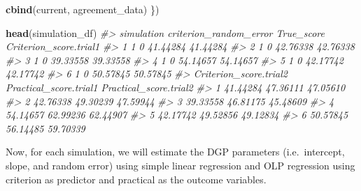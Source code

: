 \documentclass[
]{book}
\newenvironment{Shaded}{\begin{snugshade}}{\end{snugshade}}
\newcommand{\CommentTok}[1]{\textcolor[rgb]{0.56,0.35,0.01}{\textit{#1}}}
\newcommand{\KeywordTok}[1]{\textcolor[rgb]{0.13,0.29,0.53}{\textbf{#1}}}
\newcommand{\NormalTok}[1]{#1}
\begin{document}
\begin{Shaded}
\begin{Highlighting}[]
    \KeywordTok{cbind}\NormalTok{(current, agreement\_data)}
\NormalTok{  \})}

\KeywordTok{head}\NormalTok{(simulation\_df)}
\CommentTok{\#>   simulation criterion\_random\_error True\_score Criterion\_score.trial1}
\CommentTok{\#> 1          1                      0   41.44284               41.44284}
\CommentTok{\#> 2          1                      0   42.76338               42.76338}
\CommentTok{\#> 3          1                      0   39.33558               39.33558}
\CommentTok{\#> 4          1                      0   54.14657               54.14657}
\CommentTok{\#> 5          1                      0   42.17742               42.17742}
\CommentTok{\#> 6          1                      0   50.57845               50.57845}
\CommentTok{\#>   Criterion\_score.trial2 Practical\_score.trial1 Practical\_score.trial2}
\CommentTok{\#> 1               41.44284               47.36111               47.05610}
\CommentTok{\#> 2               42.76338               49.30239               47.59944}
\CommentTok{\#> 3               39.33558               46.81175               45.48609}
\CommentTok{\#> 4               54.14657               62.99236               62.44907}
\CommentTok{\#> 5               42.17742               49.52856               49.12834}
\CommentTok{\#> 6               50.57845               56.14485               59.70339}
\end{Highlighting}
\end{Shaded}

Now, for each simulation, we will estimate the DGP parameters (i.e.~intercept, slope, and random error) using simple linear regression and OLP regression using criterion as predictor and practical as the outcome variables.
\end{document}
